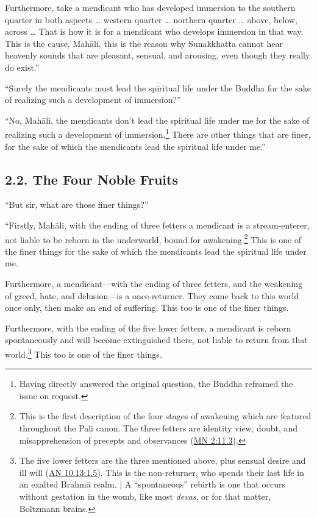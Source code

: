 \documentclass[12pt,openany]{book}%
\begin{document}
Furthermore, take a mendicant who has developed immersion to the southern quarter in both aspects … western quarter … northern quarter … above, below, across … That is how it is for a mendicant who develops immersion in that way. This is the cause, \textsanskrit{Mahāli}, this is the reason why Sunakkhatta cannot hear heavenly sounds that are pleasant, sensual, and arousing, even though they really do exist.” 

“Surely the mendicants must lead the spiritual life under the Buddha for the sake of realizing such a development of immersion?” 

“No, \textsanskrit{Mahāli}, the mendicants don’t lead the spiritual life under me for the sake of realizing such a development of immersion.\footnote{Having directly answered the original question, the Buddha reframed the issue on request. } There are other things that are finer, for the sake of which the mendicants lead the spiritual life under me.” 

\subsection*{2.2. The Four Noble Fruits }

“But sir, what are those finer things?” 

“Firstly, \textsanskrit{Mahāli}, with the ending of three fetters a mendicant is a stream-enterer, not liable to be reborn in the underworld, bound for awakening.\footnote{This is the first description of the four stages of awakening which are featured throughout the Pali canon. The three fetters are identity view, doubt, and misapprehension of precepts and observances (\href{https://suttacentral.net/mn2/en/sujato\#11.3}{MN 2:11.3}). } This is one of the finer things for the sake of which the mendicants lead the spiritual life under me. 

Furthermore, a mendicant—with the ending of three fetters, and the weakening of greed, hate, and delusion—is a once-returner. They come back to this world once only, then make an end of suffering. This too is one of the finer things. 

Furthermore, with the ending of the five lower fetters, a mendicant is reborn spontaneously and will become extinguished there, not liable to return from that world.\footnote{The five lower fetters are the three mentioned above, plus sensual desire and ill will (\href{https://suttacentral.net/an10.13/en/sujato\#1.5}{AN 10.13:1.5}). This is the non-returner, who spends their last life in an exalted \textsanskrit{Brahmā} realm. | A “spontaneous” rebirth is one that occurs without gestation in the womb, like most \textit{devas}, or for that matter, Boltzmann brains. } This too is one of the finer things. 
\end{document}
